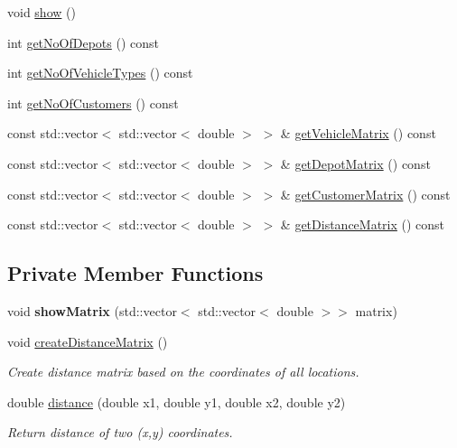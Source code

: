 \begin{DoxyCompactItemize}
void \hyperlink{class_init_a9f8816aee25eb57e9a8f133244fbffda}{show} ()
\item 
int \hyperlink{class_init_ad6dd362eb2f7b5ac46af9666b7d920da}{get\+No\+Of\+Depots} () const
\item 
int \hyperlink{class_init_a3589c9bb9d90429ca08c476163aa1b28}{get\+No\+Of\+Vehicle\+Types} () const
\item 
int \hyperlink{class_init_aa734c4109c33931c0b038b622b867c18}{get\+No\+Of\+Customers} () const
\item 
const std\+::vector$<$ std\+::vector$<$ double $>$ $>$ \& \hyperlink{class_init_a50e5ae9da26f66e57b81e1cfda053dcb}{get\+Vehicle\+Matrix} () const
\item 
const std\+::vector$<$ std\+::vector$<$ double $>$ $>$ \& \hyperlink{class_init_a8bccc72be332623cdc21c36085787fda}{get\+Depot\+Matrix} () const
\item 
const std\+::vector$<$ std\+::vector$<$ double $>$ $>$ \& \hyperlink{class_init_a571046054e4cc1f40bba8fc2e952c213}{get\+Customer\+Matrix} () const
\item 
const std\+::vector$<$ std\+::vector$<$ double $>$ $>$ \& \hyperlink{class_init_a023ffffca04fa97b54a847cb02b5d0c1}{get\+Distance\+Matrix} () const
\end{DoxyCompactItemize}
\subsection*{Private Member Functions}
\begin{DoxyCompactItemize}
\item 
\mbox{\label{class_init_ae6dd32b7bce12fb337831ec10f9c83df}} 
void {\bfseries show\+Matrix} (std\+::vector$<$ std\+::vector$<$ double $>$$>$ matrix)
\item 
\mbox{\label{class_init_ae4c5ffd68c39718f4918dda08166eedf}} 
void \hyperlink{class_init_ae4c5ffd68c39718f4918dda08166eedf}{create\+Distance\+Matrix} ()
\begin{DoxyCompactList}\small\item\em Create distance matrix based on the coordinates of all locations. \end{DoxyCompactList}\item 
double \hyperlink{class_init_a99ac0859d92852b421f4fc13973d9a70}{distance} (double x1, double y1, double x2, double y2)
\begin{DoxyCompactList}\small\item\em Return distance of two (x,y) coordinates. \end{DoxyCompactList}\end{DoxyCompactItemize}
